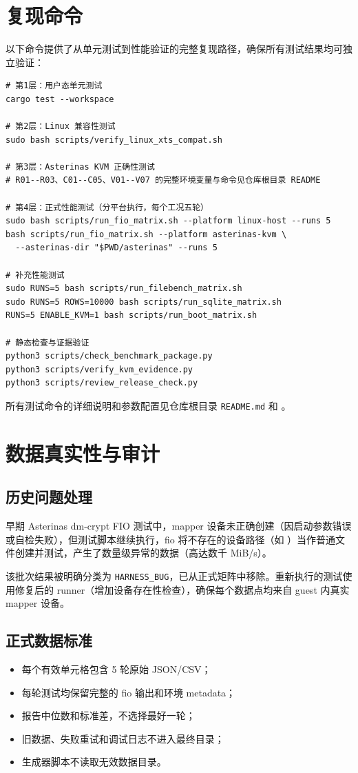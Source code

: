 \section{复现命令}

以下命令提供了从单元测试到性能验证的完整复现路径，确保所有测试结果均可独立验证：

\begin{verbatim}
# 第1层：用户态单元测试
cargo test --workspace

# 第2层：Linux 兼容性测试
sudo bash scripts/verify_linux_xts_compat.sh

# 第3层：Asterinas KVM 正确性测试
# R01--R03、C01--C05、V01--V07 的完整环境变量与命令见仓库根目录 README

# 第4层：正式性能测试（分平台执行，每个工况五轮）
sudo bash scripts/run_fio_matrix.sh --platform linux-host --runs 5
bash scripts/run_fio_matrix.sh --platform asterinas-kvm \
  --asterinas-dir "$PWD/asterinas" --runs 5

# 补充性能测试
sudo RUNS=5 bash scripts/run_filebench_matrix.sh
sudo RUNS=5 ROWS=10000 bash scripts/run_sqlite_matrix.sh
RUNS=5 ENABLE_KVM=1 bash scripts/run_boot_matrix.sh

# 静态检查与证据验证
python3 scripts/check_benchmark_package.py
python3 scripts/verify_kvm_evidence.py
python3 scripts/review_release_check.py
\end{verbatim}

所有测试命令的详细说明和参数配置见仓库根目录 \texttt{README.md} 和 \texttt{}。
\section{数据真实性与审计}

\subsection{历史问题处理}
早期 Asterinas dm-crypt FIO 测试中，mapper 设备未正确创建（因启动参数错误或自检失败），但测试脚本继续执行，fio 将不存在的设备路径（如 \texttt{}）当作普通文件创建并测试，产生了数量级异常的数据（高达数千 MiB/s）。

该批次结果被明确分类为 \texttt{HARNESS\_BUG}，已从正式矩阵中移除。重新执行的测试使用修复后的 runner（增加设备存在性检查），确保每个数据点均来自 guest 内真实 mapper 设备。

\subsection{正式数据标准}
\begin{itemize}
    \item 每个有效单元格包含 5 轮原始 JSON/CSV；
    \item 每轮测试均保留完整的 fio 输出和环境 metadata；
    \item 报告中位数和标准差，不选择最好一轮；
    \item 旧数据、失败重试和调试日志不进入最终目录；
    \item 生成器脚本不读取无效数据目录。
\end{itemize}

